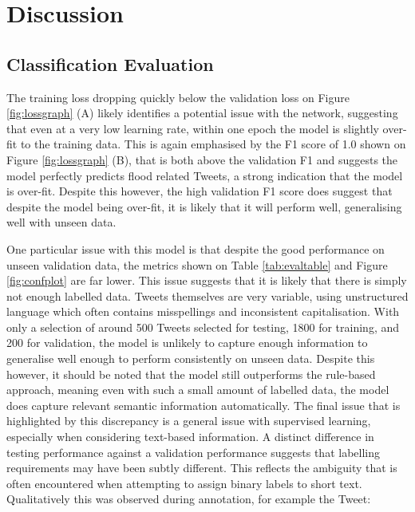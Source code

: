 \documentclass[a4paper, notitlepage]{extreport}
\begin{document}
\chapter{Discussion}

\hypertarget{classification-evaluation-1}{%
\section{Classification Evaluation}\label{classification-evaluation-1}}

The training loss dropping quickly below the validation loss on Figure
\ref{fig:lossgraph} (A) likely identifies a potential issue with the
network, suggesting that even at a very low learning rate, within one
epoch the model is slightly over-fit to the training data. This is again
emphasised by the F1 score of 1.0 shown on Figure \ref{fig:lossgraph}
(B), that is both above the validation F1 and suggests the model
perfectly predicts flood related Tweets, a strong indication that the
model is over-fit. Despite this however, the high validation F1 score
does suggest that despite the model being over-fit, it is likely that it
will perform well, generalising well with unseen data.

One particular issue with this model is that despite the good
performance on unseen validation data, the metrics shown on Table
\ref{tab:evaltable} and Figure \ref{fig:confplot} are far lower. This
issue suggests that it is likely that there is simply not enough
labelled data. Tweets themselves are very variable, using unstructured
language which often contains misspellings and inconsistent
capitalisation. With only a selection of around 500 Tweets selected for
testing, 1800 for training, and 200 for validation, the model is
unlikely to capture enough information to generalise well enough to
perform consistently on unseen data. Despite this however, it should be
noted that the model still outperforms the rule-based approach, meaning
even with such a small amount of labelled data, the model does capture
relevant semantic information automatically. The final issue that is
highlighted by this discrepancy is a general issue with supervised
learning, especially when considering text-based information. A distinct
difference in testing performance against a validation performance
suggests that labelling requirements may have been subtly different.
This reflects the ambiguity that is often encountered when attempting to
assign binary labels to short text. Qualitatively this was observed
during annotation, for example the Tweet:
\end{document}
